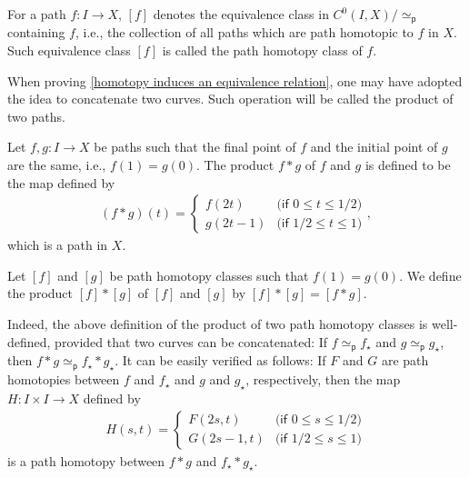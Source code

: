 \begin{nota}
    For a path $f: I\rightarrow X$, $[f]$ denotes the equivalence class in $C^0(I, X)/\simeq_\textsf{p}$ containing $f$, i.e., the collection of all paths which are path homotopic to $f$ in $X$.
    Such equivalence class $[f]$ is called the path homotopy class of $f$.
\end{nota}

When proving \cref{homotopy induces an equivalence relation}, one may have adopted the idea to concatenate two curves.
Such operation will be called the product of two paths.
\begin{defi}
    Let $f, g: I\rightarrow X$ be paths such that the final point of $f$ and the initial point of $g$ are the same, i.e., $f(1)=g(0)$.
    The product $f*g$ of $f$ and $g$ is defined to be the map defined by
    \begin{align*}
        (f*g)(t)=\left\{
            \begin{array}{cc}
                f(2t)   &   \textsf{(if $0\leq t\leq 1/2$)}\\
                g(2t-1) &   \textsf{(if $1/2\leq t\leq 1$)}
            \end{array}\right.,
    \end{align*}
    which is a path in $X$.
\end{defi}
\begin{defi}
    Let $[f]$ and $[g]$ be path homotopy classes such that $f(1)=g(0)$.
    We define the product $[f]*[g]$ of $[f]$ and $[g]$ by $[f]*[g]=[f*g]$.
\end{defi}
\begin{rmk}
    Indeed, the above definition of the product of two path homotopy classes is well-defined, provided that two curves can be concatenated: If $f\simeq_\textsf{p} f_\star$ and $g\simeq_\textsf{p} g_\star$, then $f*g\simeq_\textsf{p} f_\star*g_\star$.
    It can be easily verified as follows: If $F$ and $G$ are path homotopies between $f$ and $f_\star$ and $g$ and $g_\star$, respectively, then the map $H: I\times I\rightarrow X$ defined by
    \begin{align*}
        H(s, t)=\left\{
        \begin{array}{cc}
            F(2s, t)    & \textsf{(if $0\leq s\leq 1/2$)}\\
            G(2s-1, t)  & \textsf{(if $1/2\leq s\leq 1$)}
        \end{array}
        \right.
    \end{align*}
    is a path homotopy between $f*g$ and $f_\star*g_\star$.
\end{rmk}


